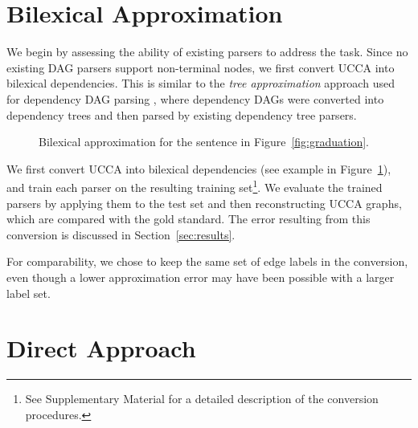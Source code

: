 \documentclass[11pt]{article}
\newcommand{\secref}[1]{Section~\ref{#1}}
\newcommand{\figref}[1]{Figure~\ref{#1}}
\begin{document}
\section{Bilexical Approximation}\label{sec:conversion}

We begin by assessing the ability of existing parsers to address the task.
Since no existing DAG parsers support non-terminal nodes, we first convert UCCA into bilexical
dependencies.
This is similar to the \textit{tree approximation} approach used for dependency DAG parsing
\cite{agic2015semantic,fernandez2015parsing},
where dependency DAGs were converted into dependency trees
and then parsed by existing dependency tree parsers.

\begin{figure}
  \caption{Bilexical approximation for the sentence in \figref{fig:graduation}.}
  \label{fig:bilexical_example}
\end{figure}

We first convert UCCA into bilexical dependencies
(see example in \figref{fig:bilexical_example}), and train each parser on the resulting
training set\footnote{See Supplementary Material for a detailed description of
the conversion procedures.}.
We evaluate the trained parsers by applying them to the test set
and then reconstructing UCCA graphs, which are compared with the gold standard.
The error resulting from this conversion is discussed in
\secref{sec:results}.

For comparability, we chose to keep the same set of edge labels in the conversion,
even though a lower approximation error may have been possible with a larger label set.

\section{Direct Approach}\label{sec:direct_approach}
\end{document}
